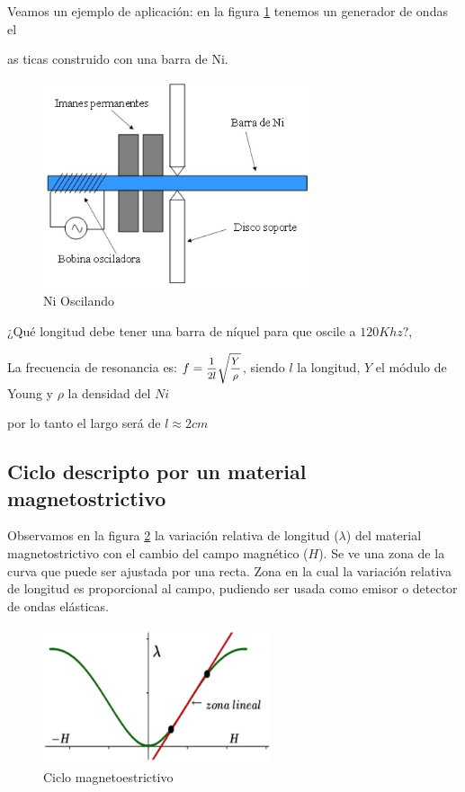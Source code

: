 Veamos un ejemplo de aplicación: en la figura \ref{fig:NiOscilando} tenemos un generador de ondas el{as ticas construido con una barra de Ni.

\begin{figure}[H]
    \centering
    \includegraphics[width=0.7\textwidth]{./Figures/NiOscilando}
	\caption{Ni Oscilando}
	\label{fig:NiOscilando}
\end{figure}


¿Qué longitud debe tener una barra de níquel para que oscile a $120Khz$?,

La frecuencia de resonancia es: $f=\mfrac{1}{2l}\sqrt{\mfrac{Y}{\rho}}$, siendo $l$ la longitud, $Y$ el módulo de Young y $\rho$ la densidad del $Ni$ 

por lo tanto el largo será de $l\approx2cm$

\subsection{Ciclo descripto por un material magnetostrictivo}

Observamos en la figura \ref{fig:magnetoestrictivoCiclo1} la variación relativa de longitud ($\lambda$) del material magnetostrictivo con el cambio del campo magnético ($H$). Se ve una zona de la curva que puede ser ajustada por una recta. Zona en la cual la variación relativa de longitud es proporcional al campo, pudiendo ser usada como emisor o detector de ondas elásticas.}

\begin{figure}[H]
    \centering
    \includegraphics[width=0.6\textwidth]{./Figures/magnetoestrictivoCiclo1}
	\caption{Ciclo magnetoestrictivo}
	\label{fig:magnetoestrictivoCiclo1}
\end{figure}


